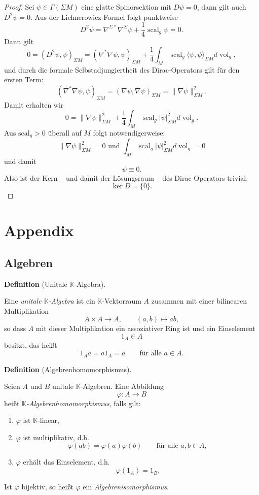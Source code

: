 \documentclass[10pt, letterpaper]{article}
\newcommand{\CustomHeading}[3]{%
  \par\medskip\noindent%
  \textbf{#1 #2} \textnormal{(#3)}.\enskip%
}
\newenvironment{DEF}[2]{\CustomHeading{Definition}{#1}{#2}}{}
\begin{document}
\begin{proof}
Sei $\psi \in \Gamma(\Sigma M)$ eine glatte Spinorsektion mit $D \psi=0$, dann gilt auch $D^2\psi=0$. Aus der Lichnerowicz-Formel folgt punktweise
$$
D^2 \psi=\nabla^{\Sigma*} \nabla^\Sigma \psi+\frac{1}{4} \operatorname{scal}_g \psi =0.
$$
Dann gilt
$$
0=\left( D^2 \psi, \psi\right)_{\Sigma M}=\left(\nabla^* \nabla \psi, \psi\right)_{\Sigma M}+\frac{1}{4} \int_M \operatorname{scal}_g\langle\psi,\psi \rangle_{\Sigma M} d \operatorname{vol}_g,
$$
und durch die formale Selbstadjungiertheit des Dirac-Operators gilt für den ersten Term:
$$
\left(\nabla^* \nabla \psi, \psi\right)_{\Sigma M}=(\nabla \psi, \nabla \psi)_{\Sigma M}=\|\nabla \psi\|_{\Sigma M}^2 .
$$
Damit erhalten wir
$$
0=\|\nabla \psi\|_{\Sigma M}^2+\frac{1}{4} \int_M \operatorname{scal}_g|\psi|^2_{\Sigma M} d \operatorname{vol}_g .
$$
Aus $\text {scal}_g>0$ überall auf $M$ folgt notwendigerweise:
$$
\|\nabla \psi\|_{\Sigma M}^2=0 \text { und } \int_M \operatorname{scal}_g|\psi|_{\Sigma M}^2 d \operatorname{vol}_g=0
$$
und damit
$$
\psi \equiv 0 .
$$
Also ist der Kern – und damit der Lösungsraum – des Dirac Operators trivial:
\[
\ker D=\{0\}.
\]
\end{proof}



\pagebreak

\section{Appendix}

\subsection{Algebren}

\begin{DEF}{}{Unitale $\mathbb{K}$-Algebra}
Eine \emph{unitale $\mathbb{K}$-Algebra} ist ein $\mathbb{K}$-Vektorraum $A$ zusammen mit
einer bilinearen Multiplikation
\[
A\times A\to A,\qquad (a,b)\mapsto ab,
\]
so dass $A$ mit dieser Multiplikation ein assoziativer Ring ist und ein Einselement
\[
1_A\in A
\]
besitzt, das heißt
\[
1_Aa=a1_A=a
\qquad\text{für alle }a\in A.
\]
\end{DEF}

\begin{DEF}{}{Algebrenhomomorphismus}
Seien $A$ und $B$ unitale $\mathbb{K}$-Algebren. Eine Abbildung
\[
\varphi:A\to B
\]
heißt \emph{$\mathbb{K}$-Algebrenhomomorphismus}, falls gilt:
\begin{enumerate}
    \item \(\varphi\) ist \(\mathbb{K}\)-linear,
    \item \(\varphi\) ist multiplikativ, d.h.
    \[
    \varphi(ab)=\varphi(a)\varphi(b)
    \qquad\text{für alle }a,b\in A,
    \]
    \item \(\varphi\) erhält das Einselement, d.h.
    \[
    \varphi(1_A)=1_B.
    \]
\end{enumerate}
Ist \(\varphi\) bijektiv, so heißt \(\varphi\) ein \emph{Algebrenisomorphismus}.
\end{DEF}
\end{document}
